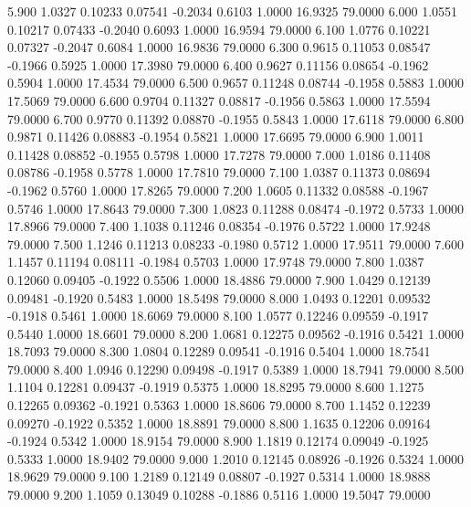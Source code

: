    5.900   1.0327   0.10233   0.07541  -0.2034   0.6103   1.0000  16.9325  79.0000
   6.000   1.0551   0.10217   0.07433  -0.2040   0.6093   1.0000  16.9594  79.0000
   6.100   1.0776   0.10221   0.07327  -0.2047   0.6084   1.0000  16.9836  79.0000
   6.300   0.9615   0.11053   0.08547  -0.1966   0.5925   1.0000  17.3980  79.0000
   6.400   0.9627   0.11156   0.08654  -0.1962   0.5904   1.0000  17.4534  79.0000
   6.500   0.9657   0.11248   0.08744  -0.1958   0.5883   1.0000  17.5069  79.0000
   6.600   0.9704   0.11327   0.08817  -0.1956   0.5863   1.0000  17.5594  79.0000
   6.700   0.9770   0.11392   0.08870  -0.1955   0.5843   1.0000  17.6118  79.0000
   6.800   0.9871   0.11426   0.08883  -0.1954   0.5821   1.0000  17.6695  79.0000
   6.900   1.0011   0.11428   0.08852  -0.1955   0.5798   1.0000  17.7278  79.0000
   7.000   1.0186   0.11408   0.08786  -0.1958   0.5778   1.0000  17.7810  79.0000
   7.100   1.0387   0.11373   0.08694  -0.1962   0.5760   1.0000  17.8265  79.0000
   7.200   1.0605   0.11332   0.08588  -0.1967   0.5746   1.0000  17.8643  79.0000
   7.300   1.0823   0.11288   0.08474  -0.1972   0.5733   1.0000  17.8966  79.0000
   7.400   1.1038   0.11246   0.08354  -0.1976   0.5722   1.0000  17.9248  79.0000
   7.500   1.1246   0.11213   0.08233  -0.1980   0.5712   1.0000  17.9511  79.0000
   7.600   1.1457   0.11194   0.08111  -0.1984   0.5703   1.0000  17.9748  79.0000
   7.800   1.0387   0.12060   0.09405  -0.1922   0.5506   1.0000  18.4886  79.0000
   7.900   1.0429   0.12139   0.09481  -0.1920   0.5483   1.0000  18.5498  79.0000
   8.000   1.0493   0.12201   0.09532  -0.1918   0.5461   1.0000  18.6069  79.0000
   8.100   1.0577   0.12246   0.09559  -0.1917   0.5440   1.0000  18.6601  79.0000
   8.200   1.0681   0.12275   0.09562  -0.1916   0.5421   1.0000  18.7093  79.0000
   8.300   1.0804   0.12289   0.09541  -0.1916   0.5404   1.0000  18.7541  79.0000
   8.400   1.0946   0.12290   0.09498  -0.1917   0.5389   1.0000  18.7941  79.0000
   8.500   1.1104   0.12281   0.09437  -0.1919   0.5375   1.0000  18.8295  79.0000
   8.600   1.1275   0.12265   0.09362  -0.1921   0.5363   1.0000  18.8606  79.0000
   8.700   1.1452   0.12239   0.09270  -0.1922   0.5352   1.0000  18.8891  79.0000
   8.800   1.1635   0.12206   0.09164  -0.1924   0.5342   1.0000  18.9154  79.0000
   8.900   1.1819   0.12174   0.09049  -0.1925   0.5333   1.0000  18.9402  79.0000
   9.000   1.2010   0.12145   0.08926  -0.1926   0.5324   1.0000  18.9629  79.0000
   9.100   1.2189   0.12149   0.08807  -0.1927   0.5314   1.0000  18.9888  79.0000
   9.200   1.1059   0.13049   0.10288  -0.1886   0.5116   1.0000  19.5047  79.0000
